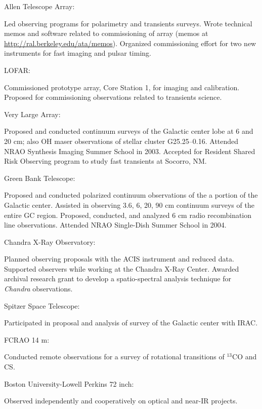 \documentclass[12pt]{article}
\begin{document}
\begin{bf}Allen Telescope Array: \end{bf}Led observing programs for polarimetry and transients surveys.  Wrote technical memos and software related to commissioning of array (memos at \url{http://ral.berkeley.edu/ata/memos}).  Organized commissioning effort for two new instruments for fast imaging and pulsar timing.

\begin{bf}LOFAR: \end{bf}Commissioned prototype array, Core Station 1, for imaging and calibration.  Proposed for commissioning observations related to transients science.

\begin{bf}Very Large Array:  \end{bf}Proposed and conducted continuum surveys of the Galactic center lobe at 6 and 20 cm;  also OH maser observations of stellar cluster G25.25--0.16.  Attended NRAO Synthesis Imaging Summer School in 2003. Accepted for Resident Shared Risk Observing program to study fast transients at Socorro, NM.

\begin{bf}Green Bank Telescope:  \end{bf}Proposed and conducted polarized continuum observations of the a portion of the Galactic center.  Assisted in observing 3.6, 6, 20, 90 cm continuum surveys of the entire GC region.  Proposed, conducted, and analyzed 6 cm radio recombination line observations.  Attended NRAO Single-Dish Summer School in 2004.

\begin{bf}Chandra X-Ray Observatory:  \end{bf}Planned observing proposals with the ACIS instrument and reduced data.  Supported observers while working at the Chandra X-Ray Center.  Awarded archival research grant to develop a spatio-spectral analysis technique for \emph{Chandra} observations.

\begin{bf}Spitzer Space Telescope:  \end{bf}Participated in proposal and analysis of survey of the Galactic center with IRAC.

\begin{bf}FCRAO 14 m:  \end{bf}Conducted remote observations for a survey of rotational transitions of $^{13}$CO and CS.

\begin{bf}Boston University-Lowell Perkins 72 inch:  \end{bf}Observed independently and cooperatively on optical and near-IR projects.
\end{document}
